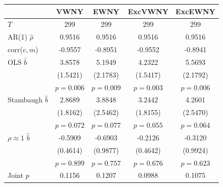 \begin{tabular}{lcccc}
\toprule
 & VWNY & EWNY & ExcVWNY & ExcEWNY \\
\midrule
$T$ & 299 & 299 & 299 & 299 \\
AR(1) $\hat\rho$ & 0.9516 & 0.9516 & 0.9516 & 0.9516 \\
corr($e,m$) & -0.9557 & -0.8951 & -0.9552 & -0.8941 \\
\midrule
OLS $\hat b$ & 3.8578 & 5.1949 & 4.2322 & 5.5693 \\
 & (1.5421) & (2.1783) & (1.5417) & (2.1792) \\
 & $p=0.006$ & $p=0.009$ & $p=0.003$ & $p=0.006$ \\
Stambaugh $\hat b$ & 2.8689 & 3.8848 & 3.2442 & 4.2601 \\
 & (1.8162) & (2.5462) & (1.8155) & (2.5470) \\
 & $p=0.072$ & $p=0.077$ & $p=0.055$ & $p=0.064$ \\
$\rho\approx1$ $\hat b$ & -0.5909 & -0.6903 & -0.2126 & -0.3120 \\
 & (0.4614) & (0.9877) & (0.4642) & (0.9924) \\
 & $p=0.899$ & $p=0.757$ & $p=0.676$ & $p=0.623$ \\
\midrule
Joint $p$ & 0.1156 & 0.1207 & 0.0988 & 0.1075 \\
\bottomrule
\end{tabular}
